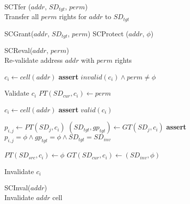 \begin{figure}
\begin{multicols}{2}
    \begin{algorithm}[H]
      \caption{SCTfer ($addr$, $SD_{tgt}$, $perm$) \\
      Transfer all $perm$ rights for $addr$ to $SD_{tgt}$    }
      \begin{algorithmic}[1]
        \State SCGrant($addr$, $SD_{tgt}$, $perm$)
        \State SCProtect ($addr$, $\phi$)
      \end{algorithmic}
      \label{alg:tfer}
    \end{algorithm}
    \vspace{-1.5\baselineskip}

    \begin{algorithm}[H]
      \caption{SCReval($addr$, $perm$)  \\
      Re-validate address $addr$ with $perm$ rights}
      \begin{algorithmic}[1]

        \State $c_i \gets cell(addr)$
        \State \textbf{assert} $invalid(c_i) \land perm \ne \phi$

        \State Validate $c_i$
        \State $PT(SD_{cur}, c_i) \gets perm$

      \end{algorithmic}
      \label{alg:screval}
    \end{algorithm}
    \vspace{-1.5\baselineskip}

    \begin{algorithm}[H]
      \caption{SCInval($addr$)  \\
      Invalidate $addr$ cell}
      \begin{algorithmic}[1]

        \State $c_i \gets cell(addr)$
        \State \textbf{assert} $valid(c_i)$

          \State $p_{i, j} \gets PT(SD_j, c_i)$
          \State $(SD_{tgt}, gp_{tgt}) \gets GT(SD_j, c_i)$
          \State \textbf{assert} $p_{i,j} = \phi \land gp_{tgt} = \phi \land SD_{tgt} = SD_{inv}$
        \EndFor

        \State $PT(SD_{src}, c_i) \gets \phi$
        \State $GT(SD_{cur}, c_i) \gets (SD_{inv}, \phi)$

        \State Invalidate $c_i$
      \end{algorithmic}
      \label{alg:scinval}
    \end{algorithm}
    \vspace{-1.5\baselineskip}


\end{multicols}
\end{figure}

